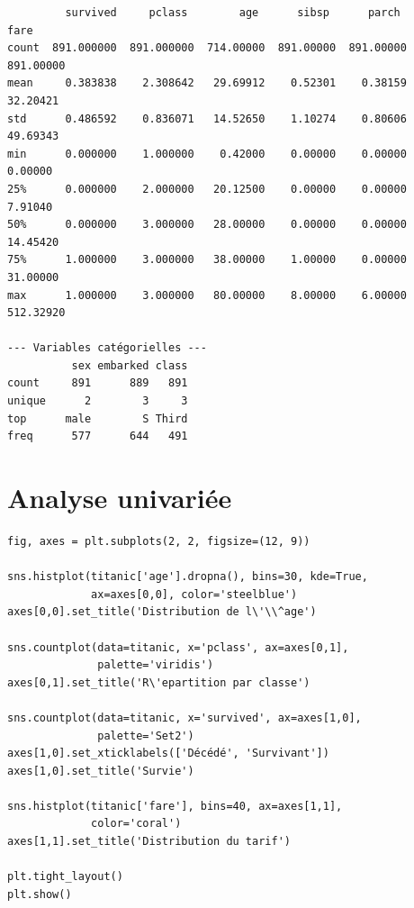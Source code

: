 \begin{codeoutput}
\begin{verbatim}
         survived     pclass        age      sibsp      parch       fare
count  891.000000  891.000000  714.00000  891.00000  891.00000  891.00000
mean     0.383838    2.308642   29.69912    0.52301    0.38159   32.20421
std      0.486592    0.836071   14.52650    1.10274    0.80606   49.69343
min      0.000000    1.000000    0.42000    0.00000    0.00000    0.00000
25%      0.000000    2.000000   20.12500    0.00000    0.00000    7.91040
50%      0.000000    3.000000   28.00000    0.00000    0.00000   14.45420
75%      1.000000    3.000000   38.00000    1.00000    0.00000   31.00000
max      1.000000    3.000000   80.00000    8.00000    6.00000  512.32920

--- Variables catégorielles ---
          sex embarked class
count     891      889   891
unique      2        3     3
top      male        S Third
freq      577      644   491
\end{verbatim}
\end{codeoutput}

\section{Analyse univari\'ee}

\begin{codeblock}[title=\textbf{Python}]
\begin{verbatim}
fig, axes = plt.subplots(2, 2, figsize=(12, 9))

sns.histplot(titanic['age'].dropna(), bins=30, kde=True,
             ax=axes[0,0], color='steelblue')
axes[0,0].set_title('Distribution de l\'\\^age')

sns.countplot(data=titanic, x='pclass', ax=axes[0,1],
              palette='viridis')
axes[0,1].set_title('R\'epartition par classe')

sns.countplot(data=titanic, x='survived', ax=axes[1,0],
              palette='Set2')
axes[1,0].set_xticklabels(['Décédé', 'Survivant'])
axes[1,0].set_title('Survie')

sns.histplot(titanic['fare'], bins=40, ax=axes[1,1],
             color='coral')
axes[1,1].set_title('Distribution du tarif')

plt.tight_layout()
plt.show()
\end{verbatim}
\end{codeblock}

